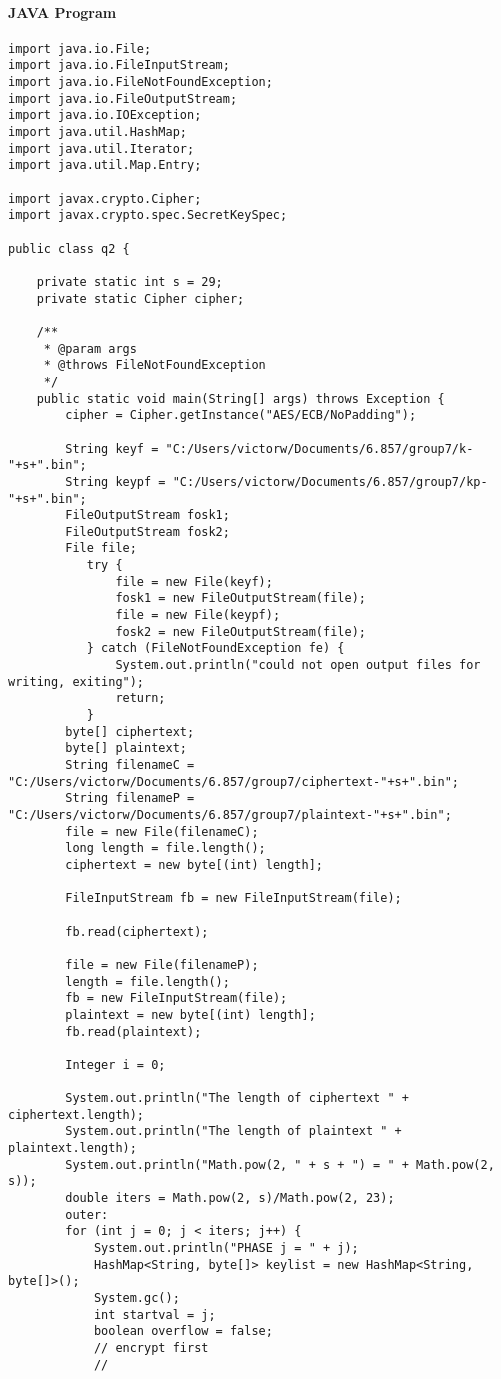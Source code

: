\documentclass[11pt]{article}
\begin{document}
\paragraph{JAVA Program}
\begin{verbatim}
import java.io.File;
import java.io.FileInputStream;
import java.io.FileNotFoundException;
import java.io.FileOutputStream;
import java.io.IOException;
import java.util.HashMap;
import java.util.Iterator;
import java.util.Map.Entry;

import javax.crypto.Cipher;
import javax.crypto.spec.SecretKeySpec;

public class q2 {

	private static int s = 29;
	private static Cipher cipher;

	/**
	 * @param args
	 * @throws FileNotFoundException
	 */
	public static void main(String[] args) throws Exception {
		cipher = Cipher.getInstance("AES/ECB/NoPadding");

		String keyf = "C:/Users/victorw/Documents/6.857/group7/k-"+s+".bin";
		String keypf = "C:/Users/victorw/Documents/6.857/group7/kp-"+s+".bin";
		FileOutputStream fosk1;
	    FileOutputStream fosk2;
	    File file;
	       try {
	           file = new File(keyf);
	           fosk1 = new FileOutputStream(file);                     
	           file = new File(keypf);
	           fosk2 = new FileOutputStream(file);
	       } catch (FileNotFoundException fe) {
	           System.out.println("could not open output files for writing, exiting");
	           return;
	       }
		byte[] ciphertext;
		byte[] plaintext;
		String filenameC = "C:/Users/victorw/Documents/6.857/group7/ciphertext-"+s+".bin";
		String filenameP = "C:/Users/victorw/Documents/6.857/group7/plaintext-"+s+".bin";
		file = new File(filenameC);
		long length = file.length();
		ciphertext = new byte[(int) length];

		FileInputStream fb = new FileInputStream(file);

		fb.read(ciphertext);

		file = new File(filenameP);
		length = file.length();
		fb = new FileInputStream(file);
		plaintext = new byte[(int) length];
		fb.read(plaintext);

		Integer i = 0;

		System.out.println("The length of ciphertext " + ciphertext.length);
		System.out.println("The length of plaintext " + plaintext.length);
		System.out.println("Math.pow(2, " + s + ") = " + Math.pow(2, s));
		double iters = Math.pow(2, s)/Math.pow(2, 23);
		outer:
		for (int j = 0; j < iters; j++) {
			System.out.println("PHASE j = " + j);
			HashMap<String, byte[]> keylist = new HashMap<String, byte[]>();
			System.gc();
			int startval = j;
			boolean overflow = false;
			// encrypt first
			//
			

\end{verbatim}
\end{document}
